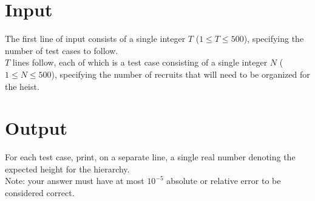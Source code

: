 \section*{Input}
The first line of input consists of a single integer $T$ ($1 \leq T \leq 500$), specifying the number of test cases to follow.\\
$T$ lines follow, each of which is a test case consisting of a single integer $N$ ($1 \leq N \leq 500$), specifying the number of recruits that will need to be organized for the heist.\\

\section*{Output}
For each test case, print, on a separate line, a single real number denoting the expected height for the hierarchy.\\
Note: your answer must have at most $10^{-5}$ absolute or relative error to be considered correct.\\
